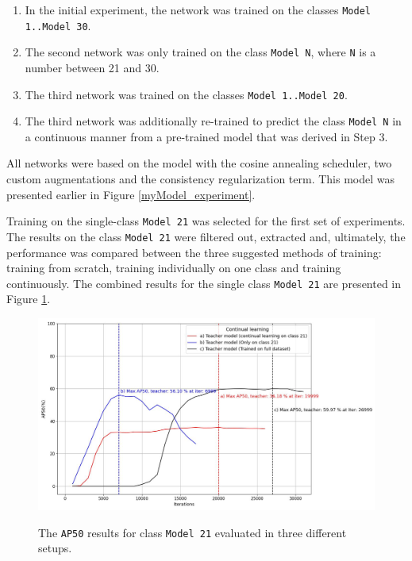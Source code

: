 \begin{enumerate}
\item In the initial experiment, the network was trained on the classes \texttt{Model 1..Model 30}.
\item The second network was only trained on the class \texttt{Model N}, where \texttt{N} is a number between 21 and 30.
\item The third network was trained on the classes \texttt{Model 1..Model 20}.
\item The third network was additionally re-trained to predict the class \texttt{Model N} in a continuous manner from a pre-trained model that was derived in Step 3.
\end{enumerate} 

All networks were based on the model with the cosine annealing scheduler, two custom augmentations and the consistency regularization term. This model was presented earlier in Figure \ref{myModel_experiment}.

Training on the single-class \texttt{Model 21} was selected for the first set of experiments. The results on the class \texttt{Model 21} were filtered out, extracted and, ultimately, the performance was compared between the three suggested methods of training: training from scratch, training individually on one class and training continuously. The combined results for the single class \texttt{Model 21} are presented in Figure \ref{myModel_continuous_experiment_1}.
\FloatBarrier

\begin{figure}[htb]
	\begin{center}
		\includegraphics[width=16cm]{./AP50_continual_21.jpg}
	\end{center}
	\caption{The \texttt{AP50} results for class \texttt{Model 21} evaluated in three different setups.}
	\begin{center}
		\label{myModel_continuous_experiment_1}
	\end{center}
\end{figure}

